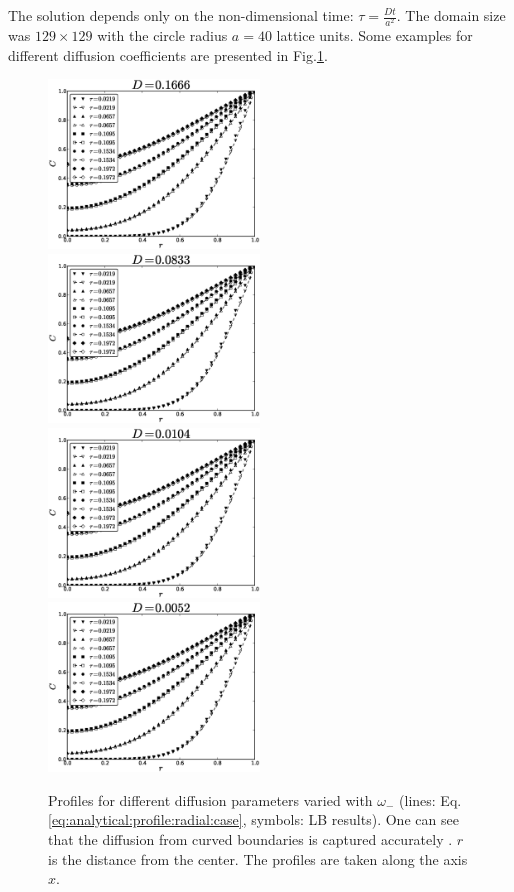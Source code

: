 \documentclass{article}
\newcommand{\omegaminus}{\omega_{-}}
\begin{document}
The solution depends only on the non-dimensional time: $\tau=\frac{D t}{a^2}$. The domain size was $129\times 129$ with the circle radius $a=40$  lattice units. Some examples for
different diffusion coefficients are presented in Fig.\ref{fig:cylinder:benchmark}.
\begin{figure}[htb!]
\includegraphics[width=0.5\textwidth]{Figures/cylinder1666.eps}
\includegraphics[width=0.5\textwidth]{Figures/cylinder0833.eps}\\
\includegraphics[width=0.5\textwidth]{Figures/cylinder0104.eps}
\includegraphics[width=0.5\textwidth]{Figures/cylinder0052.eps}\\
\caption{Profiles for different diffusion parameters varied with $\omegaminus$ (lines: Eq. \ref{eq:analytical:profile:radial:case}, symbols: LB results). One can see that the
diffusion from curved boundaries is captured
accurately \label{fig:cylinder:benchmark}. $r$ is the distance from the center. The profiles are taken along  the axis $x$.}
\end{figure}
\end{document}
